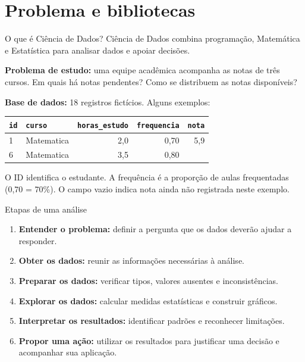 \section{Problema e bibliotecas}

\begin{frame}[t,label=cd-problema]{O que é Ciência de Dados?}
Ciência de Dados combina programação, Matemática e Estatística para analisar dados e apoiar decisões.
\begin{EMASCnote}
\textbf{Problema de estudo:} uma equipe acadêmica acompanha as notas de três cursos. Em quais há notas pendentes? Como se distribuem as notas disponíveis?
\end{EMASCnote}
\smallskip
\textbf{Base de dados:} 18 registros fictícios. Alguns exemplos:
\begin{tabularx}{\linewidth}{@{}lXrrr@{}}
\toprule
\texttt{id} & \texttt{curso} & \texttt{horas\_estudo} & \texttt{frequencia} & \texttt{nota} \\
\midrule
1 & Matematica & 2,0 & 0,70 & 5,9 \\
6 & Matematica & 3,5 & 0,80 & \\
\bottomrule
\end{tabularx}
\smallskip

\small
O ID identifica o estudante. A frequência é a proporção de aulas frequentadas (0,70 = 70\%). O campo vazio indica nota ainda não registrada neste exemplo.
\end{frame}

\begin{frame}[t]{Etapas de uma análise}
\begin{enumerate}
  \item \textbf{Entender o problema:} definir a pergunta que os dados deverão ajudar a responder.
  \item \textbf{Obter os dados:} reunir as informações necessárias à análise.
  \item \textbf{Preparar os dados:} verificar tipos, valores ausentes e inconsistências.
  \item \textbf{Explorar os dados:} calcular medidas estatísticas e construir gráficos.
  \item \textbf{Interpretar os resultados:} identificar padrões e reconhecer limitações.
  \item \textbf{Propor uma ação:} utilizar os resultados para justificar uma decisão e acompanhar sua aplicação.
\end{enumerate}
\end{frame}


